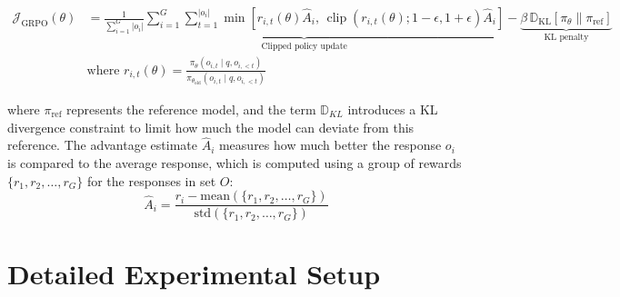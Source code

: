 \begin{equation}
    \begin{aligned}
        \mathcal{J}_{\text{GRPO}}(\theta) &= \underbrace{\frac{1}{\sum_{i=1}^{G}|o_{i}|} \sum_{i=1}^G\sum_{t=1}^{|o_i|} \min\left[ r_{i,t}(\theta) \hat{A}_i,\, \operatorname{clip}\left(r_{i,t}(\theta); 1-\epsilon, 1+\epsilon\right) \hat{A}_i \right]}_{\text{Clipped policy update}} 
        - \underbrace{\beta \, \mathbb{D}_{\text{KL}}[\pi_\theta \parallel \pi_{\text{ref}}]}_{\text{KL penalty}} \\
        &\text{where } r_{i,t}(\theta)=\frac{\pi_\theta(o_{i,t} \mid q, o_{i,<t})}{\pi_{\theta_{\text{old}}}(o_{i,t} \mid q, o_{i,<t})}
    \end{aligned}
\end{equation}



where  \( \pi_{\text{ref}} \) represents the reference model, and the term \( \mathbb{D}_{KL} \) introduces a KL divergence constraint to limit how much the model can deviate from this reference. The advantage estimate \( \hat{A}_i \) measures how much better the response \( o_i \) is compared to the average response, which is computed using a group of rewards \( \{r_1, r_2, \dots, r_G\} \) for the responses in set \( O \):
\begin{equation}
   \hat{A}_i = \frac{r_i - \text{mean}(\{r_1, r_2, \dots, r_G\})}{\text{std}(\{r_1, r_2, \dots, r_G\})}
\end{equation}

\section{Detailed Experimental Setup}
\label{appx:detailed_setup}
